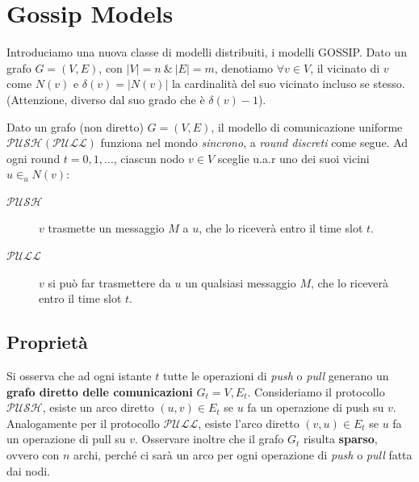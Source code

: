 \chapter{Gossip Models}

Introduciamo una nuova classe di modelli distribuiti, i modelli GOSSIP. Dato un grafo $G = (V, E)$, con $|V| = n\ \&\ |E| = m$, denotiamo $\forall v \in V$, il vicinato di $v$ come $N(v)$ e $\delta(v) = |N(v)|$ la cardinalità del suo vicinato incluso se stesso. (Attenzione, diverso dal suo grado che è $\delta(v) - 1$).

\begin{definizione}
    Dato un grafo (non diretto) $G=(V, E)$, il modello di comunicazione uniforme $\mathcal{PUSH (PULL)}$ funziona nel mondo \textit{sincrono}, a \textit{round discreti} come segue. Ad ogni round $t = 0,1, \dots$, ciascun nodo $v \in V$ sceglie u.a.r uno dei suoi vicini $u \in_{u} N(v)$:
    \begin{description}
        \item[$\mathcal{PUSH}$] $v$ trasmette un messaggio $M$ a $u$, che lo riceverà entro il time slot $t$.
        \item[$\mathcal{PULL}$] $v$ si può far trasmettere da $u$ un qualsiasi messaggio $M$, che lo riceverà entro il time slot $t$.
    \end{description}
\end{definizione}

\section{Proprietà}

Si osserva che ad ogni istante $t$ tutte le operazioni di \textit{push} o \textit{pull} generano un \textbf{grafo diretto delle comunicazioni} $G_t = {V, E_t}$. Consideriamo il protocollo $\mathcal{PUSH}$, esiste un arco diretto $(u, v) \in E_t$ se $u$ fa un operazione di push su $v$. Analogamente per il protocollo $\mathcal{PULL}$, esiste l'arco diretto $(v, u) \in E_t$ se $u$ fa un operazione di pull su $v$. Osservare inoltre che il grafo $G_t$ risulta \textbf{sparso}, ovvero con $n$ archi, perché ci sarà un arco per ogni operazione di \textit{push} o \textit{pull} fatta dai nodi.

